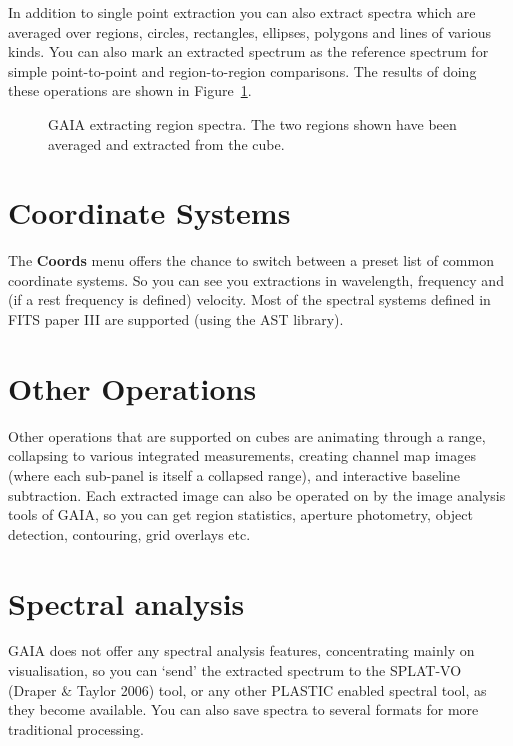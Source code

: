 \documentclass[11pt,twoside]{article}  %
\begin{document}
In addition to single point extraction you can also extract spectra which are
averaged over regions, circles, rectangles, ellipses, polygons and lines of
various kinds. You can also mark an extracted spectrum as the reference
spectrum for simple point-to-point and region-to-region comparisons.
The results of doing these operations are shown in Figure~\ref{D1.1-fig2}.

\begin{figure}
\caption{GAIA extracting region spectra. The two regions shown have been
averaged and extracted from the cube.}
\label{D1.1-fig2}
\end{figure}


\section{Coordinate Systems}

The \textbf{Coords} menu offers the chance to switch between a preset list of
common coordinate systems. So you can see you extractions in wavelength,
frequency and (if a rest frequency is defined) velocity. Most of the spectral
systems defined in FITS paper III are supported (using the AST library).

\section{Other Operations}

Other operations that are supported on cubes are animating through a range,
collapsing to various integrated measurements, creating channel map images
(where each sub-panel is itself a collapsed range), and interactive baseline
subtraction. Each extracted image can also be operated on by the image
analysis tools of GAIA, so you can get region statistics, aperture photometry,
object detection, contouring, grid overlays etc.

\section{Spectral analysis}

GAIA does not offer any spectral analysis features, concentrating mainly on
visualisation, so you can `send' the extracted spectrum to the SPLAT-VO
(Draper \& Taylor 2006) tool, or any other PLASTIC enabled spectral tool, as
they become available. You can also save spectra to several formats for more
traditional processing.

%
\end{document}
